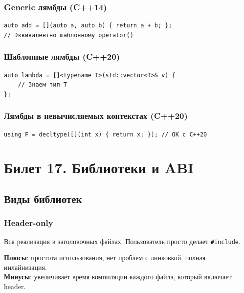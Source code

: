 \documentclass[12pt,a4paper]{article}
\begin{document}
\subsubsection{Generic лямбды (C++14)}

\begin{lstlisting}
auto add = [](auto a, auto b) { return a + b; };
// Эквивалентно шаблонному operator()
\end{lstlisting}

\subsubsection{Шаблонные лямбды (C++20)}

\begin{lstlisting}
auto lambda = []<typename T>(std::vector<T>& v) {
    // Знаем тип T
};
\end{lstlisting}

\subsubsection{Лямбды в невычисляемых контекстах (C++20)}

\begin{lstlisting}
using F = decltype([](int x) { return x; }); // OK с C++20
\end{lstlisting}

\section{Билет 17. Библиотеки и ABI}

\subsection{Виды библиотек}

\subsubsection{Header-only}
Вся реализация в заголовочных файлах. Пользователь просто делает \texttt{\#include}.

\textbf{Плюсы}: простота использования, нет проблем с линковкой, полная инлайнизация.\\
\textbf{Минусы}: увеличивает время компиляции каждого файла, который включает header.
\end{document}
